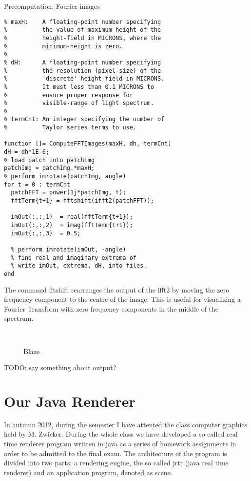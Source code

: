 \begin{algorithm}
\caption{Precomputation: Fourier images}
\begin{lstlisting}
% maxH:    A floating-point number specifying 
%          the value of maximum height of the 
%          height-field in MICRONS, where the 
%          minimum-height is zero. 
%         
% dH:      A floating-point number specifying 
%          the resolution (pixel-size) of the 
%          'discrete' height-field in MICRONS. 
%          It must less than 0.1 MICRONS to 
%          ensure proper response for 
%          visible-range of light spectrum.
%
% termCnt: An integer specifying the number of 
%          Taylor series terms to use.

function []= ComputeFFTImages(maxH, dh, termCnt)
dH = dh*1E-6;
% load patch into patchImg
patchImg = patchImg.*maxH;
% perform imrotate(patchImg, angle)
for t = 0 : termCnt
  patchFFT = power(1j*patchImg, t);
  fftTerm{t+1} = fftshift(ifft2(patchFFT));
  
  imOut(:,:,1)  = real(fftTerm{t+1});
  imOut(:,:,2)  = imag(fftTerm{t+1});
  imOut(:,:,3)  = 0.5;
  
  % perform imrotate(imOut, -angle)
  % find real and imaginary extrema of 
  % write imOut, extrema, dH, into files.
end
\end{lstlisting}
\end{algorithm}

The command fftshift rearranges the output of the ifft2 by moving the zero frequency component to the centre of the image. This is useful for visualizing a Fourier Transform with zero frequency components in the middle of the spectrum.


\begin{figure}[ht]
  \centering
~
  

  \label{matlabBlazeFourierImages}
  \caption{Blaze}
\end{figure}


TODO: say something about output?

\section{Our Java Renderer}
In autumn 2012, during the semester I have attented the class computer graphics held by M. Zwicker. During the whole class we have developed a so called real time renderer program written in java as a series of homework assignments in order to be admitted to the final exam. The architecture of the program is divided into two parts: a rendering engine, the so called jrtr (java real time renderer) and an application program, denoted as scene.

